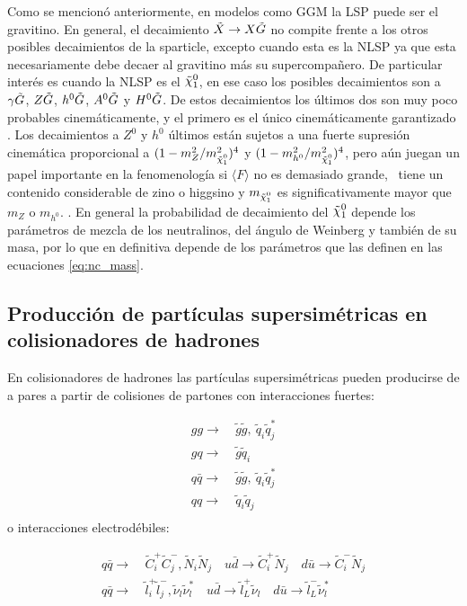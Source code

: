 Como se mencionó anteriormente, en modelos como GGM la LSP puede ser el gravitino. En general, el decaimiento $\tilde{X} \to X\tilde{G}$ no compite frente a los otros posibles decaimientos de la sparticle, excepto cuando esta es la NLSP ya que esta necesariamente debe decaer al gravitino más su supercompañero. De particular interés es cuando la NLSP es el $\ninoone$, en ese caso los posibles decaimientos son a $\gamma\tilde{G}$, $Z\tilde{G}$, $h^0\tilde{G}$, $A^0\tilde{G}$ y $H^0\tilde{G}$. De estos decaimientos los últimos dos son muy poco probables cinemáticamente, y el primero es el único cinemáticamente garantizado . Los decaimientos a $Z^0$ y $h^0$ últimos están sujetos a una fuerte supresión cinemática proporcional a $ (1-m_{Z}^{2}/m_{\ninoone}^{2})^4$ y $(1-m_{h^{0}}^{2}/m_{\ninoone}^{2})^4$, pero aún juegan un papel importante en la fenomenología si $ \langle F \rangle $ no es demasiado grande, \ninoone\ tiene un contenido considerable de zino o higgsino y $m_{\ninoone}$ es significativamente mayor que $m_{Z}$ o $m_{h^{0}}$. . En general la probabilidad de decaimiento del $\ninoone$ depende los parámetros de mezcla de los neutralinos, del ángulo de Weinberg y también de su masa, por lo que en definitiva depende de los parámetros que las definen en las ecuaciones \ref{eq:nc_mass}.

\subsection{Producción de partículas supersimétricas en colisionadores de hadrones}

En colisionadores de hadrones las partículas supersimétricas pueden producirse de a pares a partir de colisiones de partones con interacciones fuertes:

\begin{equation}
	\begin{split}
		gg\to &\ \tilde{g}\tilde{g},\ \tilde{q}_i\tilde{q}_j^* \\ 
		gq\to &\ \tilde{g}\tilde{q}_i \\ 
		q\bar{q}\to &\ \tilde{g}\tilde{g},\ \tilde{q}_i\tilde{q}_j^* \\ 
		qq\to &\ \tilde{q}_i\tilde{q}_j \\ 
	\end{split}
\end{equation}
%
o interacciones electrodébiles:

\begin{equation}
	\begin{split}
		q\bar{q}\to &\ \tilde{C}_i^{+}\tilde{C}_j^{-},\tilde{N}_i\tilde{N}_j \quad u\bar{d}\to\tilde{C}_i^{+}\tilde{N}_j \quad d\bar{u}\to\tilde{C}_i^{-}\tilde{N}_j \\
		q\bar{q}\to &\ \tilde{l}_i^{+}\tilde{l}_j^{-},\tilde{\nu}_l\tilde{\nu}_l^* \quad u\bar{d}\to\tilde{l}_L^{+}\tilde{\nu}_l \quad d\bar{u}\to\tilde{l}_L^{-}\tilde{\nu}_l^* \\
	\end{split}
\end{equation}

